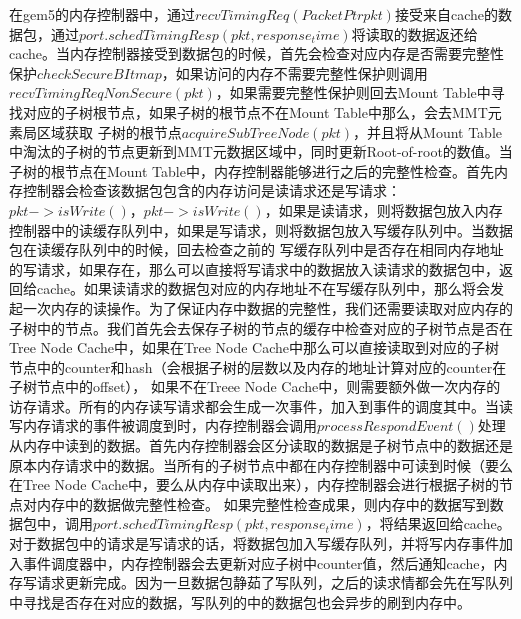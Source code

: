 在gem5的内存控制器中，通过$recvTimingReq(PacketPtr pkt)$接受来自cache的数据包，通过$port.schedTimingResp(pkt, response_time)$将读取的数据返还给cache。当内存控制器接受到数据包的时候，首先会检查对应内存是否需要完整性保护$checkSecureBItmap$，如果访问的内存不需要完整性保护则调用$recvTimingReqNonSecure(pkt)$，如果需要完整性保护则回去Mount Table中寻找对应的子树根节点，如果子树的根节点不在Mount Table中那么，会去MMT元素局区域获取
子树的根节点$acquireSubTreeNode(pkt)$，并且将从Mount Table中淘汰的子树的节点更新到MMT元数据区域中，同时更新Root-of-root的数值。当子树的根节点在Mount Table中，内存控制器能够进行之后的完整性检查。首先内存控制器会检查该数据包包含的内存访问是读请求还是写请求：$pkt->isWrite()$，$pkt->isWrite()$，如果是读请求，则将数据包放入内存控制器中的读缓存队列中，如果是写请求，则将数据包放入写缓存队列中。当数据包在读缓存队列中的时候，回去检查之前的
写缓存队列中是否存在相同内存地址的写请求，如果存在，那么可以直接将写请求中的数据放入读请求的数据包中，返回给cache。如果读请求的数据包对应的内存地址不在写缓存队列中，那么将会发起一次内存的读操作。为了保证内存中数据的完整性，我们还需要读取对应内存的子树中的节点。我们首先会去保存子树的节点的缓存中检查对应的子树节点是否在Tree Node Cache中，如果在Tree Node Cache中那么可以直接读取到对应的子树节点中的counter和hash（会根据子树的层数以及内存的地址计算对应的counter在子树节点中的offset），
如果不在Treee Node Cache中，则需要额外做一次内存的访存请求。所有的内存读写请求都会生成一次事件，加入到事件的调度其中。当读写内存请求的事件被调度到时，内存控制器会调用$processRespondEvent()$处理从内存中读到的数据。首先内存控制器会区分读取的数据是子树节点中的数据还是原本内存请求中的数据。当所有的子树节点中都在内存控制器中可读到时候（要么在Tree Node Cache中，要么从内存中读取出来），内存控制器会进行根据子树的节点对内存中的数据做完整性检查。
如果完整性检查成果，则内存中的数据写到数据包中，调用$port.schedTimingResp(pkt, response_time)$，将结果返回给cache。对于数据包中的请求是写请求的话，将数据包加入写缓存队列，并将写内存事件加入事件调度器中，内存控制器会去更新对应子树中counter值，然后通知cache，内存写请求更新完成。因为一旦数据包静茹了写队列，之后的读求情都会先在写队列中寻找是否存在对应的数据，写队列的中的数据包也会异步的刷到内存中。
